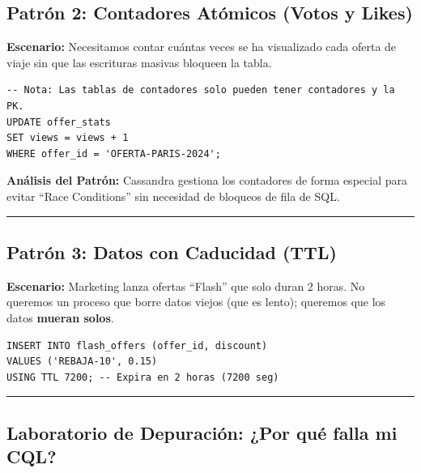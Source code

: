 \documentclass[12pt,a4paper]{article}
\begin{document}
\subsection{Patrón 2: Contadores Atómicos (Votos y Likes)}\label{counters}
\textbf{Escenario:} Necesitamos contar cuántas veces se ha visualizado cada oferta de viaje sin que las escrituras masivas bloqueen la tabla.

\begin{tcolorbox}[title=Uso de la tabla \texttt{offer\_stats}]
\begin{lstlisting}[language=CQL]
-- Nota: Las tablas de contadores solo pueden tener contadores y la PK.
UPDATE offer_stats 
SET views = views + 1 
WHERE offer_id = 'OFERTA-PARIS-2024';
\end{lstlisting}
\end{tcolorbox}

\textbf{Análisis del Patrón:}
Cassandra gestiona los contadores de forma especial para evitar \enquote{Race Conditions} sin necesidad de bloqueos de fila de SQL.

\begin{center}\rule{0.5\linewidth}{0.5pt}\end{center}

\subsection{Patrón 3: Datos con Caducidad (TTL)}\label{ttl}
\textbf{Escenario:} Marketing lanza ofertas \enquote{Flash} que solo duran 2 horas. No queremos un proceso que borre datos viejos (que es lento); queremos que los datos \textbf{mueran solos}.

\begin{tcolorbox}[title=Inserción con TTL]
\begin{lstlisting}[language=CQL]
INSERT INTO flash_offers (offer_id, discount) 
VALUES ('REBAJA-10', 0.15) 
USING TTL 7200; -- Expira en 2 horas (7200 seg)
\end{lstlisting}
\end{tcolorbox}

\begin{center}\rule{0.5\linewidth}{0.5pt}\end{center}

\subsection{Laboratorio de Depuración: ¿Por qué falla mi CQL?}\label{debug}
\end{document}
